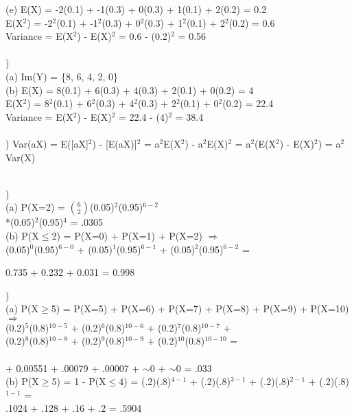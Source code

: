 \documentclass[12pt]{article}
\begin{document}
\indent (e) E(X) = -2(0.1) + -1(0.3) + 0(0.3) + 1(0.1) + 2(0.2) = 0.2\\[.4em]
\indent \indent E(X$^2$) = -2$^2$(0.1) + -1$^2$(0.3) + 0$^2$(0.3) + 1$^2$(0.1) + 2$^2$(0.2) = 0.6\\[.4em]
\indent \indent Variance = E(X$^2$) - E(X)$^2$ = 0.6 - (0.2)$^2$ = 0.56\\



\noindent \hrulefill \\


)\\
\indent (a) Im(Y) = \{8, 6, 4, 2, 0\}\\

\indent (b) E(X) = 8(0.1) + 6(0.3) + 4(0.3) + 2(0.1) + 0(0.2) = 4\\[.4em]
\indent \indent E(X$^2$) = 8$^2$(0.1) + 6$^2$(0.3) + 4$^2$(0.3) + 2$^2$(0.1) + 0$^2$(0.2) = 22.4\\[.4em]
\indent \indent Variance = E(X$^2$) - E(X)$^2$ = 22.4 - (4)$^2$ = 38.4\\


\noindent \hrulefill \\


) Var(aX) = E([aX]$^2$) - [E(aX)]$^2$ = a$^2$E(X$^2$) - a$^2$E(X)$^2$ = a$^2$(E(X$^2$) - E(X)$^2$) =  a$^2$Var(X)


\noindent \hrulefill \\


) \\ 
\indent (a) P(X=2) = {\Large$\binom{6}{2}$}(0.05)$^2$(0.95)$^{6-2}$\\[.4em]
\indent {}*(0.05)$^2$(0.95)$^{4}$ = .0305\\

\indent (b) P(X$\le$2) = P(X=0) + P(X=1) + P(X=2) $\Rightarrow$\\[.4em]
\indent {}(0.05)$^0$(0.95)$^{6-0}$ +
(0.05)$^1$(0.95)$^{6-1}$ +
(0.05)$^2$(0.95)$^{6-2}$ =\\[.4em]
\centerline{ 0.735 + 0.232 + 0.031 = 0.998 }


\noindent \hrulefill 
\pagebreak


)\\
\indent (a) P(X$\ge$5) = P(X=5) + P(X=6) + P(X=7) + P(X=8) + P(X=9) + P(X=10) $\Rightarrow$\\[.4em]
\indent {}(0.2)$^{5}$(0.8)$^{10-5}$ +
(0.2)$^{6}$(0.8)$^{10-6}$ +
(0.2)$^{7}$(0.8)$^{10-7}$ +\\[.4em]
\indent {}(0.2)$^{8}$(0.8)$^{10-8}$ +
(0.2)$^{9}$(0.8)$^{10-9}$ +
(0.2)$^{10}$(0.8)$^{10-10}$ =\\\\
\indent {} + 0.00551 + .00079 + .00007 + $\sim$0 + $\sim$0 = .033\\

\indent (b) P(X$\ge$5) = 1 - P(X$\le$4) = (.2)(.8)$^{4-1}$ + (.2)(.8)$^{3-1}$ + (.2)(.8)$^{2-1}$ + (.2)(.8)$^{1-1}$ =\\[.4em]
\indent \indent .1024 + .128 + .16 + .2 = .5904
\end{document}
